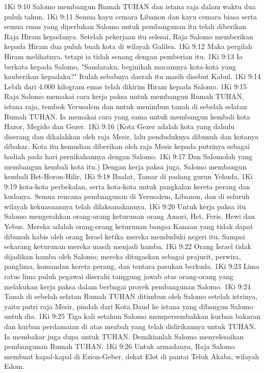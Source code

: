 1Ki 9:10  Salomo membangun Rumah TUHAN dan istana raja dalam waktu dua puluh tahun.
1Ki 9:11  Semua kayu cemara Libanon dan kayu cemara biasa serta semua emas yang diperlukan Salomo untuk pembangunan itu telah diberikan Raja Hiram kepadanya. Setelah pekerjaan itu selesai, Raja Salomo memberikan kepada Hiram dua puluh buah kota di wilayah Galilea.
1Ki 9:12  Maka pergilah Hiram melihatnya, tetapi ia tidak senang dengan pemberian itu.
1Ki 9:13  Ia berkata kepada Salomo, "Saudaraku, beginikah macamnya kota-kota yang kauberikan kepadaku?" Itulah sebabnya daerah itu masih disebut Kabul.
1Ki 9:14  Lebih dari 4.000 kilogram emas telah dikirim Hiram kepada Salomo.
1Ki 9:15  Raja Salomo memakai cara kerja paksa untuk membangun Rumah TUHAN, istana raja, tembok Yerusalem dan untuk menimbun tanah di sebelah selatan Rumah TUHAN. Ia memakai cara yang sama untuk membangun kembali kota Hazor, Megido dan Gezer.
1Ki 9:16  (Kota Gezer adalah kota yang dahulu diserang dan dikalahkan oleh raja Mesir, lalu penduduknya dibunuh dan kotanya dibakar. Kota itu kemudian diberikan oleh raja Mesir kepada putrinya sebagai hadiah pada hari pernikahannya dengan Salomo.
1Ki 9:17  Dan Salomolah yang membangun kembali kota itu.) Dengan kerja paksa juga, Salomo membangun kembali Bet-Horon-Hilir,
1Ki 9:18  Baalat, Tamar di padang gurun Yehuda,
1Ki 9:19  kota-kota perbekalan, serta kota-kota untuk pangkalan kereta perang dan kudanya. Semua rencana pembangunan di Yerusalem, Libanon, dan di seluruh wilayah kekuasaannya telah dilaksanakannya.
1Ki 9:20  Untuk kerja paksa itu Salomo mengerahkan orang-orang keturunan orang Amori, Het, Feris, Hewi dan Yebus. Mereka adalah orang-orang keturunan bangsa Kanaan yang tidak dapat dibunuh habis oleh orang Israel ketika mereka menduduki negeri itu. Sampai sekarang keturunan mereka masih menjadi hamba.
1Ki 9:22  Orang Israel tidak dijadikan hamba oleh Salomo; mereka ditugaskan sebagai prajurit, perwira, panglima, komandan kereta perang, dan tentara pasukan berkuda.
1Ki 9:23  Lima ratus lima puluh pegawai diserahi tanggung jawab atas orang-orang yang melakukan kerja paksa dalam berbagai proyek pembangunan Salomo.
1Ki 9:24  Tanah di sebelah selatan Rumah TUHAN ditimbun oleh Salomo setelah istrinya, yaitu putri raja Mesir, pindah dari Kota Daud ke istana yang dibangun Salomo untuk dia.
1Ki 9:25  Tiga kali setahun Salomo mempersembahkan kurban bakaran dan kurban perdamaian di atas mezbah yang telah didirikannya untuk TUHAN. Ia membakar juga dupa untuk TUHAN. Demikianlah Salomo menyelesaikan pembangunan Rumah TUHAN.
1Ki 9:26  Untuk armadanya, Raja Salomo membuat kapal-kapal di Ezion-Geber, dekat Elot di pantai Teluk Akaba, wilayah Edom.
